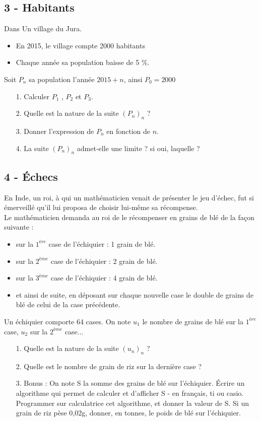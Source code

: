 \documentclass[12pt]{article}
\begin{document}
\begin{multicols}{2}
\subsection*{3 - Habitants}

Dans Un village du Jura.
\begin{itemize}
\item En 2015, le village compte 2000 habitants
\item Chaque année sa population baisse de 5 \%.
\end{itemize}
Soit $P_n$ sa population l’année $2015 + n$, ainsi $P_0 = 2000$

\begin{enumerate}
\item[1.] Calculer $P_1$ , $P_2$ et $P_3$.
\item[2.] Quelle est la nature de la suite $(P_n)_n$ ?
\item[3.] Donner l’expression de $P_n$ en fonction de $n$.
\item[4.] La suite $(P_n)_n$ admet-elle une limite ? si oui, laquelle ?
\end{enumerate}

\noindent\hrulefill

\subsection*{4 - Échecs}

En Inde, un roi, à qui un mathématicien venait de présenter le jeu d'échec, fut si émerveillé qu'il lui proposa de choisir lui-même sa récompense. \\
Le mathématicien demanda au roi de le récompenser en grains de blé de la façon suivante :

\begin{itemize}
\item sur la $1^{ère}$ case de l'échiquier : 1 grain de blé.
\item sur la $2^{ème}$ case de l'échiquier : 2 grain de blé.
\item sur la $3^{ème}$ case de l'échiquier : 4 grain de blé.
\item et ainsi de suite, en déposant sur chaque nouvelle case le double de grains de blé de celui de la case précédente.
\end{itemize}

Un  échiquier comporte 64 cases. On note $u_1$ le nombre de grains de blé sur la $1^{ère}$ case, $u_2$ sur la $2^{ème}$ case...

\begin{enumerate}
\item[1.] Quelle est la nature de la suite $(u_n)_n$ ?
\item[2.] Quelle est le nombre de grain de riz sur la dernière case ?
\item[3.] Bonus : On note S la somme des grains de blé sur l'échiquier.
Écrire un algorithme qui permet de calculer et d’afficher S - en français, ti ou casio.
Programmer sur calculatrice cet algorithme, et donner la valeur de S. Si un grain de riz pèse 0,02g, donner, en tonnes, le poids de blé sur l'échiquier.
\end{enumerate}

\end{multicols}
\end{document}
